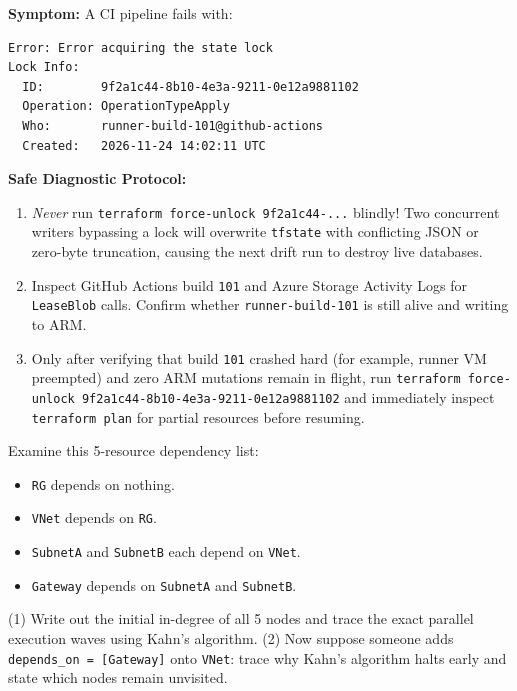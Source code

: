 \begin{realworldbox}
\textbf{Symptom:} A CI pipeline fails with:
\begin{verbatim}
Error: Error acquiring the state lock
Lock Info:
  ID:        9f2a1c44-8b10-4e3a-9211-0e12a9881102
  Operation: OperationTypeApply
  Who:       runner-build-101@github-actions
  Created:   2026-11-24 14:02:11 UTC
\end{verbatim}
\textbf{Safe Diagnostic Protocol:}
\begin{enumerate}[leftmargin=12pt]
  \item \emph{Never} run \texttt{terraform force-unlock 9f2a1c44-...} blindly! Two concurrent writers bypassing a lock will overwrite \texttt{tfstate} with conflicting JSON or zero-byte truncation, causing the next drift run to destroy live databases.
  \item Inspect GitHub Actions build \texttt{101} and Azure Storage Activity Logs for \texttt{LeaseBlob} calls. Confirm whether \texttt{runner-build-101} is still alive and writing to ARM.
  \item Only after verifying that build \texttt{101} crashed hard (for example, runner VM preempted) and zero ARM mutations remain in flight, run \texttt{terraform force-unlock 9f2a1c44-8b10-4e3a-9211-0e12a9881102} and immediately inspect \texttt{terraform plan} for partial resources before resuming.
\end{enumerate}
\end{realworldbox}

\begin{tryityourselfbox}
Examine this 5-resource dependency list:
\begin{itemize}[leftmargin=12pt]
  \item \texttt{RG} depends on nothing.
  \item \texttt{VNet} depends on \texttt{RG}.
  \item \texttt{SubnetA} and \texttt{SubnetB} each depend on \texttt{VNet}.
  \item \texttt{Gateway} depends on \texttt{SubnetA} and \texttt{SubnetB}.
\end{itemize}
(1) Write out the initial in-degree of all 5 nodes and trace the exact parallel execution waves using Kahn's algorithm. (2) Now suppose someone adds \texttt{depends\_on = [Gateway]} onto \texttt{VNet}: trace why Kahn's algorithm halts early and state which nodes remain unvisited.
\end{tryityourselfbox}

